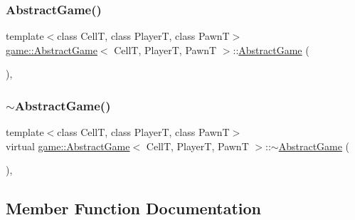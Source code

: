 \mbox{\label{classgame_1_1_abstract_game_a4947b8268696a1d6d2d15bfad1cbe197}} 
\subsubsection{\texorpdfstring{Abstract\+Game()}{AbstractGame()}\hspace{0.1cm}{\footnotesize\ttfamily [2/2]}}
{\footnotesize\ttfamily template$<$class CellT, class PlayerT, class PawnT$>$ \\
\hyperlink{classgame_1_1_abstract_game}{game\+::\+Abstract\+Game}$<$ CellT, PlayerT, PawnT $>$\+::\hyperlink{classgame_1_1_abstract_game}{Abstract\+Game} (\begin{DoxyParamCaption}\item[{const \hyperlink{classgame_1_1_abstract_game}{Abstract\+Game}$<$ CellT, PlayerT, PawnT $>$ \&}]{ }\end{DoxyParamCaption})\hspace{0.3cm}{\ttfamily [explicit]}, {\ttfamily [default]}}

\mbox{\label{classgame_1_1_abstract_game_aadcf523d247e4f8beccc539a08f40464}} 
\subsubsection{\texorpdfstring{$\sim$\+Abstract\+Game()}{~AbstractGame()}}
{\footnotesize\ttfamily template$<$class CellT, class PlayerT, class PawnT$>$ \\
virtual \hyperlink{classgame_1_1_abstract_game}{game\+::\+Abstract\+Game}$<$ CellT, PlayerT, PawnT $>$\+::$\sim$\hyperlink{classgame_1_1_abstract_game}{Abstract\+Game} (\begin{DoxyParamCaption}{ }\end{DoxyParamCaption})\hspace{0.3cm}{\ttfamily [inline]}, {\ttfamily [virtual]}}



\subsection{Member Function Documentation}
\mbox{\label{classgame_1_1_abstract_game_a3683d4f37908f769a470af6ebf73d849}} 
